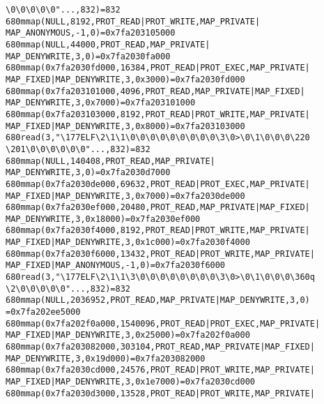 \documentclass[pdf, unicode, 12pt, a4paper,oneside,fleqn]{article}
\begin{document}
\begin{alltt}
\textbackslash0\textbackslash0\textbackslash0\textbackslash0\textbackslash0"..., 832) = 832
680   mmap(NULL, 8192, PROT_READ|PROT_WRITE, MAP_PRIVATE|
MAP_ANONYMOUS, -1, 0) = 0x7fa203105000
680   mmap(NULL, 44000, PROT_READ, MAP_PRIVATE|
MAP_DENYWRITE, 3, 0) = 0x7fa2030fa000
680   mmap(0x7fa2030fd000, 16384, PROT_READ|PROT_EXEC, MAP_PRIVATE|
MAP_FIXED|MAP_DENYWRITE, 3, 0x3000) = 0x7fa2030fd000
680   mmap(0x7fa203101000, 4096, PROT_READ, MAP_PRIVATE|MAP_FIXED|
MAP_DENYWRITE, 3, 0x7000) = 0x7fa203101000
680   mmap(0x7fa203103000, 8192, PROT_READ|PROT_WRITE, MAP_PRIVATE|
MAP_FIXED|MAP_DENYWRITE, 3, 0x8000) = 0x7fa203103000
680   read(3, "\textbackslash177ELF\textbackslash2\textbackslash1\textbackslash1\textbackslash0\textbackslash0\textbackslash0\textbackslash0\textbackslash0\textbackslash0\textbackslash0\textbackslash0\textbackslash0\textbackslash3\textbackslash0>\textbackslash0\textbackslash1\textbackslash0\textbackslash0\textbackslash0\textbackslash220
\textbackslash201\textbackslash0\textbackslash0\textbackslash0\textbackslash0\textbackslash0\textbackslash0"..., 832) = 832
680   mmap(NULL, 140408, PROT_READ, MAP_PRIVATE|
MAP_DENYWRITE, 3, 0) = 0x7fa2030d7000
680   mmap(0x7fa2030de000, 69632, PROT_READ|PROT_EXEC, MAP_PRIVATE|
MAP_FIXED|MAP_DENYWRITE, 3, 0x7000) = 0x7fa2030de000
680   mmap(0x7fa2030ef000, 20480, PROT_READ, MAP_PRIVATE|MAP_FIXED|
MAP_DENYWRITE, 3, 0x18000) = 0x7fa2030ef000
680   mmap(0x7fa2030f4000, 8192, PROT_READ|PROT_WRITE, MAP_PRIVATE|
MAP_FIXED|MAP_DENYWRITE, 3, 0x1c000) = 0x7fa2030f4000
680   mmap(0x7fa2030f6000, 13432, PROT_READ|PROT_WRITE, MAP_PRIVATE|
MAP_FIXED|MAP_ANONYMOUS, -1, 0) = 0x7fa2030f6000
680   read(3, "\textbackslash177ELF\textbackslash2\textbackslash1\textbackslash1\textbackslash3\textbackslash0\textbackslash0\textbackslash0\textbackslash0\textbackslash0\textbackslash0\textbackslash0\textbackslash0\textbackslash3\textbackslash0>\textbackslash0\textbackslash1\textbackslash0\textbackslash0\textbackslash0\textbackslash360q
\textbackslash2\textbackslash0\textbackslash0\textbackslash0\textbackslash0\textbackslash0"..., 832) = 832
680   mmap(NULL, 2036952, PROT_READ, MAP_PRIVATE|MAP_DENYWRITE, 3, 0)
 = 0x7fa202ee5000
680   mmap(0x7fa202f0a000, 1540096, PROT_READ|PROT_EXEC, MAP_PRIVATE|
MAP_FIXED|MAP_DENYWRITE, 3, 0x25000) = 0x7fa202f0a000
680   mmap(0x7fa203082000, 303104, PROT_READ, MAP_PRIVATE|MAP_FIXED|
MAP_DENYWRITE, 3, 0x19d000) = 0x7fa203082000
680   mmap(0x7fa2030cd000, 24576, PROT_READ|PROT_WRITE, MAP_PRIVATE|
MAP_FIXED|MAP_DENYWRITE, 3, 0x1e7000) = 0x7fa2030cd000
680   mmap(0x7fa2030d3000, 13528, PROT_READ|PROT_WRITE, MAP_PRIVATE|

\end{alltt}
\end{document}

